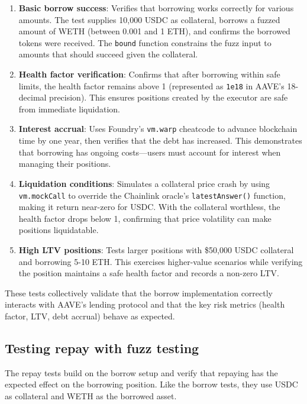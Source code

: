 \begin{enumerate}
    \item \textbf{Basic borrow success}: Verifies that borrowing works correctly for various amounts. The test supplies 10,000 USDC as collateral, borrows a fuzzed amount of WETH (between 0.001 and 1 ETH), and confirms the borrowed tokens were received. The \texttt{bound} function constrains the fuzz input to amounts that should succeed given the collateral.

    \item \textbf{Health factor verification}: Confirms that after borrowing within safe limits, the health factor remains above 1 (represented as \texttt{1e18} in AAVE's 18-decimal precision). This ensures positions created by the executor are safe from immediate liquidation.

    \item \textbf{Interest accrual}: Uses Foundry's \texttt{vm.warp} cheatcode to advance blockchain time by one year, then verifies that the debt has increased. This demonstrates that borrowing has ongoing costs---users must account for interest when managing their positions.

    \item \textbf{Liquidation conditions}: Simulates a collateral price crash by using \texttt{vm.mockCall} to override the Chainlink oracle's \texttt{latestAnswer()} function, making it return near-zero for USDC. With the collateral worthless, the health factor drops below 1, confirming that price volatility can make positions liquidatable.

    \item \textbf{High LTV positions}: Tests larger positions with \$50,000 USDC collateral and borrowing 5-10 ETH. This exercises higher-value scenarios while verifying the position maintains a safe health factor and records a non-zero LTV.
\end{enumerate}

These tests collectively validate that the borrow implementation correctly interacts with AAVE's lending protocol and that the key risk metrics (health factor, LTV, debt accrual) behave as expected.

\subsection{Testing repay with fuzz testing}

The repay tests build on the borrow setup and verify that repaying has the expected effect on the borrowing position. Like the borrow tests, they use USDC as collateral and WETH as the borrowed asset.

